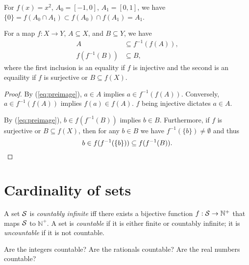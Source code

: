 \begin{exm}
  For $f(x)=x^2$, $A_0=[-1,0]$, $A_1=[0,1]$,
  we have $\{0\}=f(A_0\cap A_1)\subset f(A_0)\cap f(A_1)=A_1$.
\end{exm}

\begin{lem}
  \label{lem:preimageSubsetIdentites}
  For a map $f: X\rightarrow Y$, $A\subseteq X$,
  and $B\subseteq Y$,
  we have
  \begin{align}
    \label{eq:preimageSubsetIdentitesA}
    A &\subseteq f^{-1}(f(A)),
    \\
    \label{eq:preimageSubsetIdentitesffInvB}
    f(f^{-1}(B))&\subseteq B,
  \end{align}
  where the first inclusion
  is an equality if $f$ is injective 
  and the second is an equaility
  if $f$ is surjective or $B\subseteq f(X)$.
\end{lem}
\begin{proof}
  By (\ref{eq:preimage}), $a\in A$ implies
  $a\in f^{-1}(f(A))$.
  Conversely, $a\in f^{-1}(f(A))$ implies
   $f(a)\in f(A)$.
   $f$ being injective dictates $a\in A$.

  By (\ref{eq:preimage}), $b\in f(f^{-1}(B))$ implies
  $b\in B$.
  Furthermore, if $f$ is surjective or $B\subseteq f(X)$,
  then for any $b\in B$ we have $f^{-1}(\{b\})\ne \emptyset$
  and thus
  \begin{displaymath}
    b\in f(f^{-1}(\{b\})) \subseteq f(f^{-1}(B)).\qedhere
  \end{displaymath}
\end{proof}


\section{Cardinality of sets}
\label{sec:count-unco-sets}

\begin{defn}
  \label{def:countability}
  A set ${\cal S}$ is \emph{countably infinite}
   iff there exists a bijective function
   $f:{\cal S}\rightarrow \mathbb{N}^+$
   that maps ${\cal S}$ to $\mathbb{N}^+$.
  A set is \emph{countable}
  if it is either finite or countably infinite;
  it is \emph{uncountable}
  if it is not countable.
\end{defn}

\begin{exc}
  Are the integers countable?
  Are the rationals countable?
  Are the real numbers countable?
\end{exc}


